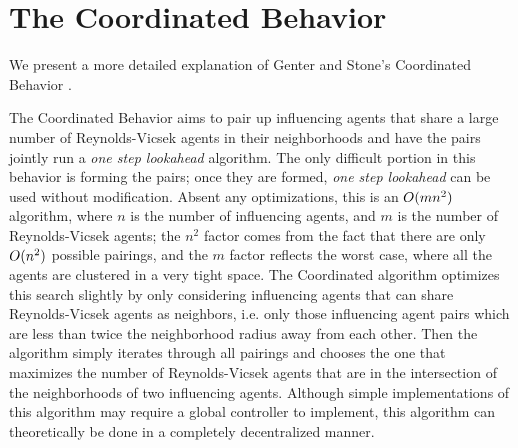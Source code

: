 \chapter{The Coordinated Behavior}
\label{ch:AppendixB}

We present a more detailed explanation of Genter and Stone's Coordinated
Behavior \cite{genter201612steplookahead}.

The Coordinated Behavior aims to pair up influencing agents that share a large
number of Reynolds-Vicsek agents in their neighborhoods and have the pairs
jointly run a \textit{one step lookahead} algorithm.
The only difficult portion in this behavior is forming the pairs; once they are
formed, \textit{one step lookahead} can be used without modification.
Absent any optimizations, this is an $\smash{O}(mn^2)$ algorithm, where $n$ is the
number of influencing agents, and $m$ is the number
of Reynolds-Vicsek agents; the $n^2$ factor comes from the fact that there are
only $\smash{O}(n^2)$ possible pairings, and the $m$ factor reflects the worst case,
where all the agents are clustered in a very tight space.
The Coordinated algorithm optimizes this search slightly by only considering
influencing agents that can share Reynolds-Vicsek agents as neighbors, i.e.
only those influencing agent pairs which are less than twice the neighborhood
radius away from each other.
Then the algorithm simply iterates through all pairings and chooses the one
that maximizes the number of Reynolds-Vicsek agents that are in the
intersection of the neighborhoods of two influencing agents.
Although simple implementations of this algorithm may require a global
controller to implement, this algorithm can theoretically be done in a
completely decentralized manner.
